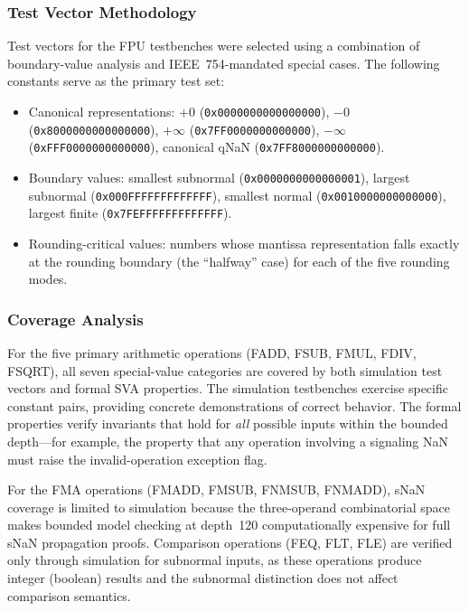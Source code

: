 \documentclass[journal]{IEEEtran}
\begin{document}
\subsubsection{Test Vector Methodology}
Test vectors for the FPU testbenches were selected using a combination of
boundary-value analysis and IEEE~754-mandated special cases.  The
following constants serve as the primary test set:
\begin{itemize}[leftmargin=*]
\item Canonical representations: $+0$ (\texttt{0x0000000000000000}),
      $-0$ (\texttt{0x8000000000000000}), $+\infty$
      (\texttt{0x7FF0000000000000}), $-\infty$
      (\texttt{0xFFF0000000000000}), canonical qNaN
      (\texttt{0x7FF8000000000000}).
\item Boundary values: smallest subnormal
      (\texttt{0x0000000000000001}), largest subnormal
      (\texttt{0x000FFFFFFFFFFFFF}), smallest normal
      (\texttt{0x0010000000000000}), largest finite
      (\texttt{0x7FEFFFFFFFFFFFFF}).
\item Rounding-critical values: numbers whose mantissa representation
      falls exactly at the rounding boundary (the ``halfway'' case)
      for each of the five rounding modes.
\end{itemize}

\subsubsection{Coverage Analysis}
For the five primary arithmetic operations (FADD, FSUB, FMUL, FDIV,
FSQRT), all seven special-value categories are covered by both
simulation test vectors and formal SVA properties.  The simulation
testbenches exercise specific constant pairs, providing concrete
demonstrations of correct behavior.  The formal properties verify
invariants that hold for \emph{all} possible inputs within the bounded
depth---for example, the property that any operation involving a
signaling NaN must raise the invalid-operation exception flag.

For the FMA operations (FMADD, FMSUB, FNMSUB, FNMADD), sNaN coverage is
limited to simulation because the three-operand combinatorial space
makes bounded model checking at depth~120 computationally expensive for
full sNaN propagation proofs.  Comparison operations (FEQ, FLT, FLE) are
verified only through simulation for subnormal inputs, as these
operations produce integer (boolean) results and the subnormal
distinction does not affect comparison semantics.
\end{document}

